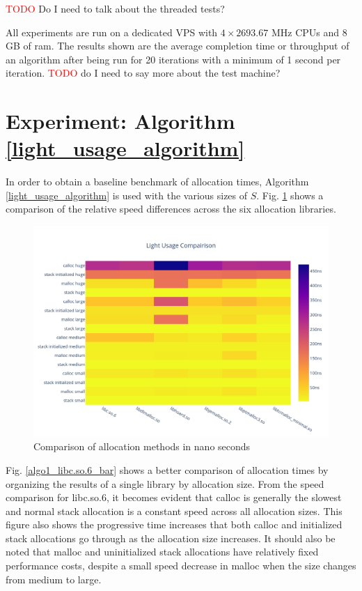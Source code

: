 \documentclass[letterpaper, 10 pt, conference]{ieeeconf}  %
\newcommand*\todo[0]{\textcolor{red}{TODO }}
\begin{document}
\todo Do I need to talk about the threaded tests?

All experiments are run on a dedicated VPS with $4 \times 2693.67$ MHz CPUs and $8$GB of ram.
The results shown are the average completion time or throughput of an algorithm after being run for 20 iterations with a minimum of 1 second per iteration.
\todo do I need to say more about the test machine?

\section{Experiment: Algorithm \ref{light_usage_algorithm}}
In order to obtain a baseline benchmark of allocation times, Algorithm \ref{light_usage_algorithm} is used with the various sizes of $S$.
Fig. \ref{algo1_complete_hist} shows a comparison of the relative speed differences across the six allocation libraries.


\begin{figure}[tbh!]
  \centering
  \includegraphics[width=\columnwidth]{graphs/light_hist.png}
  \caption{ Comparison of allocation methods in nano seconds }
  \label{algo1_complete_hist}
\end{figure} 


Fig. \ref{algo1_libc.so.6_bar} shows a better comparison of allocation times by organizing the results of a single library by allocation size.
From the speed comparison for libc.so.6, it becomes evident that calloc is generally the slowest and normal stack allocation is a constant speed across all allocation sizes.
This figure also shows the progressive time increases that both calloc and initialized stack allocations go through as the allocation size increases.
It should also be noted that malloc and uninitialized stack allocations have relatively fixed performance costs, despite a small speed decrease in malloc when the size changes from medium to large.
\end{document}
